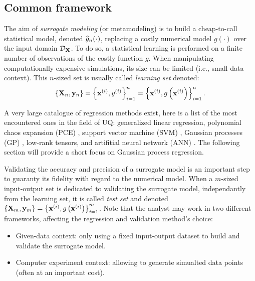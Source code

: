 \subsection{Common framework}

The aim of \textit{surrogate modeling} (or metamodeling) is to build a cheap-to-call statistical model, denoted $\widehat{g}_n(\cdot)$, replacing a costly numerical model $g(\cdot)$ over the input domain $\mathcal{D}_{{\bf X}}$. 
To do so, a statistical learning is performed on a finite number of observations of the costly function $g$. 
When manipulating computationally expensive simulations, its size can be limited (i.e., small-data context). 
This $n$-sized set is usually called \textit{learning set} denoted: 
\begin{equation}
    \left\{{\bf X}_n, {\bf y}_n\right\} = \left\{{\bf x}^{(i)}, y^{(i)}\right\}_{i=1}^n
                                = \left\{{\bf x}^{(i)}, g\left({\bf x}^{(i)}\right)\right\}_{i=1}^n.    
\end{equation}

A very large catalogue of regression methods exist, here is a list of the most encountered ones in the field of UQ:
generalized linear regression, polynomial chaos expansion (PCE) \citep{soize_2004, blatman_2011}, support vector machine (SVM) \citep{vapnik_1995}, 
Gaussian processes (GP) \citep{rasmussen_2006}, low-rank tensors, and artifitial neural network (ANN) \citep{tibshirani_2009}.
The following section will provide a short focus on Gaussian process regression.

Validating the accuracy and precision of a surrogate model is an important step to guaranty its fidelity with regard to the numerical model. 
When a $m$-sized input-output set is dedicated to validating the surrogate model, independantly from the learning set, 
it is called \textit{test set} and denoted $\left\{{\bf X}_m, {\bf y}_m\right\} = \left\{{\bf x}^{(i)}, g\left({\bf x}^{(i)}\right)\right\}_{i=1}^m$. 
Note that the analyst may work in two different frameworks, affecting the regression and validation method's choice: 
\begin{itemize}
    \item Given-data context: only using a fixed input-output dataset to build and validate the surrogate model. 
    \item Computer experiment context: allowing to generate simualted data points (often at an important cost).
\end{itemize}

